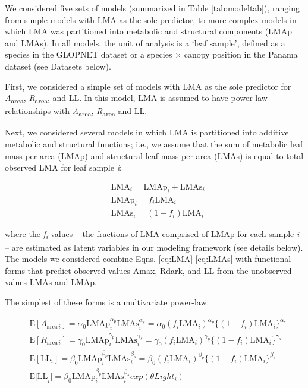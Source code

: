 \documentclass[
  12pt,
  a4paper,
,tablecaptionabove
]{scrartcl}
\begin{document}
We considered five sets of models (summarized in Table \ref{tab:modeltab}), ranging from simple models with LMA as the sole predictor, to more complex models in which LMA was partitioned into metabolic and structural components (LMAp and LMAs).
In all models, the unit of analysis is a `leaf sample', defined as a species in the GLOPNET dataset or a species \(\times\) canopy position in the Panama dataset (see Datasets below).

First, we considered a simple set of models with LMA as the sole predictor for \emph{A}\textsubscript{area}, \emph{R}\textsubscript{area}, and LL.
In this model, LMA is assumed to have power-law relationships with \emph{A}\textsubscript{area}, \emph{R}\textsubscript{area} and LL.

Next, we considered several models in which LMA is partitioned into additive metabolic and structural functions; i.e., we assume that the sum of metabolic leaf mass per area (LMAp) and structural leaf mass per area (LMAs) is equal to total observed LMA for leaf sample \emph{i}:

\begin{align}
  &\mathrm{LMA}_{i} =\mathrm{LMAp}_{i} + \mathrm{LMAs}_{i} \label{eq:LMA}\\
  &\mathrm{LMAp}_{i} = f_{i} \mathrm{LMA}_{i} \label{eq:LMAp}\\
  &\mathrm{LMAs}_{i} = (1 - f_{i})  \mathrm{LMA}_{i}\label{eq:LMAs}
\end{align}

where the \emph{f\textsubscript{i}} values -- the fractions of LMA comprised of LMAp for each sample \emph{i} -- are estimated as latent variables in our modeling framework (see details below).
The models we considered combine Eqns. \eqref{eq:LMA}-\eqref{eq:LMAs} with functional forms that predict observed values Amax, Rdark, and LL from the unobserved values LMAs and LMAp.

The simplest of these forms is a multivariate power-law:

\begin{align}
& \mathrm{E}[A_{\mathrm{area} \, i}]
= \alpha_0\mathrm{LMAp}_{i}^{\alpha_p}\mathrm{LMAs}_i^{\alpha_s}  =  \alpha_0 (f_i \mathrm{LMA}_{i})^{\alpha_p} \bigl\{(1-f_i) \mathrm{LMA}_{i}\bigr\}^{\alpha_s} \label{eq:E-A} \\
& \mathrm{E}[R_{\mathrm{area} \, i}]
= \gamma_0\mathrm{LMAp}_{i}^{\gamma_p} \mathrm{LMAs}_{i}^{\gamma_s}
= \gamma_0 (f_i \mathrm{LMA}_{i})^{\gamma_p} \bigl\{(1-f_i)\mathrm{LMA}_{i}\bigr\}^{\gamma_s} \label{eq:E-R} \\
& \mathrm{E}[\mathrm{LL}_i] = \beta_0\mathrm{LMAp}_{i}^{\beta_p} \mathrm{LMAs}_{i}^{\beta_s}   = \beta_0 (f_i \mathrm{LMA}_{i})^{\beta_p} \bigl\{(1-f_i) \mathrm{LMA}_{i}\bigr\}^{\beta_s} \tag{6a}  \\
& \mathrm{E[LL}_i] = \beta_0\mathrm{LMAp}_{i}^{\beta_p} \mathrm{LMAs}_{i}^{\beta_s} exp(\theta Light_i) \tag{6b}
\end{align}
\end{document}
